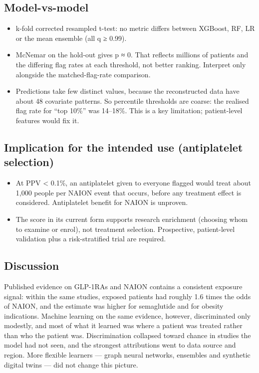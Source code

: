 \documentclass[
  11pt,
]{article}
\providecommand{\tightlist}{%
  \setlength{\itemsep}{0pt}\setlength{\parskip}{0pt}}
\begin{document}
\subsection{Model-vs-model}\label{model-vs-model}

\begin{itemize}
\tightlist
\item
  k-fold corrected resampled t-test: no metric differs between XGBoost,
  RF, LR or the mean ensemble (all q ≥ 0.99).
\item
  McNemar on the hold-out gives p ≈ 0. That reflects millions of
  patients and the differing flag rates at each threshold, not better
  ranking. Interpret only alongside the matched-flag-rate comparison.
\item
  Predictions take few distinct values, because the reconstructed data
  have about 48 covariate patterns. So percentile thresholds are coarse:
  the realised flag rate for ``top 10\%'' was 14--18\%. This is a key
  limitation; patient-level features would fix it.
\end{itemize}

\subsection{Implication for the intended use (antiplatelet
selection)}\label{implication-for-the-intended-use-antiplatelet-selection}

\begin{itemize}
\tightlist
\item
  At PPV \textless{} 0.1\%, an antiplatelet given to everyone flagged
  would treat about 1,000 people per NAION event that occurs, before any
  treatment effect is considered. Antiplatelet benefit for NAION is
  unproven.
\item
  The score in its current form supports research enrichment (choosing
  whom to examine or enrol), not treatment selection. Prospective,
  patient-level validation plus a risk-stratified trial are required.
\end{itemize}

\subsection{Discussion}\label{discussion}

Published evidence on GLP-1RAs and NAION contains a consistent exposure
signal: within the same studies, exposed patients had roughly 1.6 times
the odds of NAION, and the estimate was higher for semaglutide and for
obesity indications. Machine learning on the same evidence, however,
discriminated only modestly, and most of what it learned was where a
patient was treated rather than who the patient was. Discrimination
collapsed toward chance in studies the model had not seen, and the
strongest attributions went to data source and region. More flexible
learners --- graph neural networks, ensembles and synthetic digital
twins --- did not change this picture.
\end{document}
